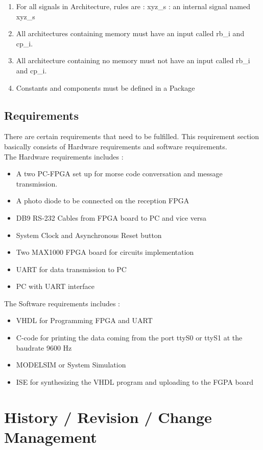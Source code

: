 \documentclass[12pt,a4paper]{article}
\begin{document}
\begin{enumerate}
\item For all signals in Architecture, rules are : xyz\_s  : an internal signal named xyz\_s\
\item All architectures containing memory must have an input called rb\_i and cp\_i.\
\item All architecture containing no memory must not have an input called rb\_i  and cp\_i.\
\item Constants and components must be defined in a Package\


\end{enumerate}


\subsection{Requirements}
There are certain requirements that need to be fulfilled. This requirement section basically consists of Hardware requirements and software requirements.\\

The Hardware requirements includes :\
\begin{itemize}
\item A two PC-FPGA set up for morse code conversation and message transmission.\
\item A photo diode to be connected on the reception FPGA\
\item DB9 RS-232 Cables from FPGA board to PC and vice versa\
\item System Clock and Asynchronous Reset button\
\item Two MAX1000 FPGA board for circuits implementation\
\item UART for data transmission to PC\
\item PC with UART interface\
\end{itemize}

The Software requirements includes :\
\begin{itemize}
\item VHDL for Programming FPGA and UART\
\item C-code for printing the data coming from the port ttyS0 or ttyS1 at the baudrate 9600 Hz\
\item MODELSIM or System Simulation\
\item ISE for synthesizing the VHDL program and uploading to the FGPA board\
\end{itemize}

\newpage
\renewcommand{\baselinestretch}{1.5} %
\section{History / Revision / Change Management}
\end{document}
